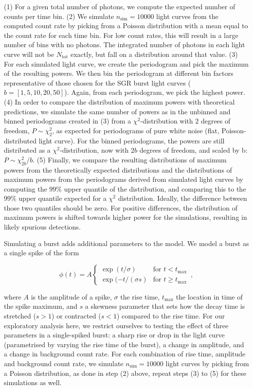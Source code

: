 \documentclass[numberedappendix]{emulateapj}
\begin{document}
(1) For a given total number of photons, we compute the expected number of counts per time bin. 
(2) We simulate $n_{\mathrm{sim}} = 10000$ light curves from the computed count rate by picking from a Poisson distribution with a mean equal to the count rate for each time bin. For low count rates, this will result in a large number of bins with no photons. The integrated number of photons in each light curve will not be $N_{\mathrm{tot}}$ exactly, but fall on a distribution around that value.
(3) For each simulated light curve, we create the periodogram and pick the maximum of the resulting powers. We then bin the periodogram at different bin factors representative of those chosen for the SGR burst light curves ($b = [1, 5, 10, 20, 50]$). Again, from each periodogram, we pick the highest power.
(4) In order to compare the distribution of maximum powers with theoretical predictions, we simulate the same number of powers as in the unbinned and binned periodograms created in (3) from a $\chi^2$-distribution with $2$ degrees of freedom, $P \sim \chi^2_2$, as expected for periodograms of pure white noise (flat, Poisson-distributed light curve). For the binned periodograms, the powers are still distributed as a $\chi^2$-distribution, now with $2b$ degrees of freedom, and scaled by b: $P \sim \chi^2_{2b}/b$.
(5) Finally, we compare the resulting distributions of maximum powers from the theoretically expected distributions and the distributions of maximum powers from the periodograms derived from simulated light curves by computing the $99\%$ upper quantile of the distribution, and comparing this to the $99\%$ upper quantile expected for a $\chi^2$ distribution. Ideally, the difference between those two quantiles should be zero. For positive differences, the distribution of maximum powers is shifted towards higher power for the simulations, resulting in likely spurious detections. 


Simulating a burst adds additional parameters to the model. We model a burst as a single spike of the form

\begin{equation}
\phi(t) = A \left\{\begin{array}{ll}\exp(t/\sigma) & \mbox{for $t<t_\mathrm{max}$}\\ \exp(-t/(\sigma s) & \mbox{for $t\geq t_{\mathrm{max}}$}\end{array}\right. \, ,
\label{eqn:spikemodel}
\end{equation}

where $A$ is the amplitude of a spike, $\sigma$ the rise time, $t_\mathrm{max}$ the location in time of the spike maximum, and $s$ a skewness parameter that sets how the decay time is stretched ($s > 1$) or contracted ($s < 1$) compared to the rise time. 
For our exploratory analysis here, we restrict ourselves to testing the effect of three parameters in a single-spiked burst: a sharp rise or drop in the light curve (parametrised by varying the rise time of the burst), a change in amplitude, and a change in background count rate. For each combination of rise time, amplitude and background count rate, we simulate $n_{\mathrm{sim}} = 10000$  light curves by picking from a Poisson distribution, as done in step (2) above, repeat steps (3) to (5) for these simulations as well. 
\end{document}
